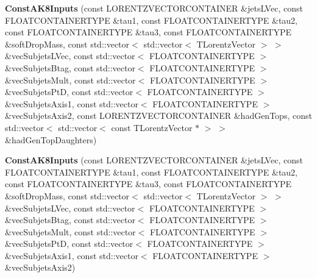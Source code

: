 \begin{DoxyCompactItemize}
\item 
\hypertarget{classttUtility_1_1ConstAK8Inputs_a355eeb50c57d2a7cbe153cd94ba368e7}{{\bfseries Const\-A\-K8\-Inputs} (const L\-O\-R\-E\-N\-T\-Z\-V\-E\-C\-T\-O\-R\-C\-O\-N\-T\-A\-I\-N\-E\-R \&jets\-L\-Vec, const F\-L\-O\-A\-T\-C\-O\-N\-T\-A\-I\-N\-E\-R\-T\-Y\-P\-E \&tau1, const F\-L\-O\-A\-T\-C\-O\-N\-T\-A\-I\-N\-E\-R\-T\-Y\-P\-E \&tau2, const F\-L\-O\-A\-T\-C\-O\-N\-T\-A\-I\-N\-E\-R\-T\-Y\-P\-E \&tau3, const F\-L\-O\-A\-T\-C\-O\-N\-T\-A\-I\-N\-E\-R\-T\-Y\-P\-E \&soft\-Drop\-Mass, const std\-::vector$<$ std\-::vector$<$ T\-Lorentz\-Vector $>$ $>$ \&vec\-Subjets\-L\-Vec, const std\-::vector$<$ F\-L\-O\-A\-T\-C\-O\-N\-T\-A\-I\-N\-E\-R\-T\-Y\-P\-E $>$ \&vec\-Subjets\-Btag, const std\-::vector$<$ F\-L\-O\-A\-T\-C\-O\-N\-T\-A\-I\-N\-E\-R\-T\-Y\-P\-E $>$ \&vec\-Subjets\-Mult, const std\-::vector$<$ F\-L\-O\-A\-T\-C\-O\-N\-T\-A\-I\-N\-E\-R\-T\-Y\-P\-E $>$ \&vec\-Subjets\-Pt\-D, const std\-::vector$<$ F\-L\-O\-A\-T\-C\-O\-N\-T\-A\-I\-N\-E\-R\-T\-Y\-P\-E $>$ \&vec\-Subjets\-Axis1, const std\-::vector$<$ F\-L\-O\-A\-T\-C\-O\-N\-T\-A\-I\-N\-E\-R\-T\-Y\-P\-E $>$ \&vec\-Subjets\-Axis2, const L\-O\-R\-E\-N\-T\-Z\-V\-E\-C\-T\-O\-R\-C\-O\-N\-T\-A\-I\-N\-E\-R \&had\-Gen\-Tops, const std\-::vector$<$ std\-::vector$<$ const T\-Lorentz\-Vector $\ast$ $>$ $>$ \&had\-Gen\-Top\-Daughters)}\label{classttUtility_1_1ConstAK8Inputs_a355eeb50c57d2a7cbe153cd94ba368e7}

\item 
\hypertarget{classttUtility_1_1ConstAK8Inputs_afb4037a21d4530d01d600dfdcf76971e}{{\bfseries Const\-A\-K8\-Inputs} (const L\-O\-R\-E\-N\-T\-Z\-V\-E\-C\-T\-O\-R\-C\-O\-N\-T\-A\-I\-N\-E\-R \&jets\-L\-Vec, const F\-L\-O\-A\-T\-C\-O\-N\-T\-A\-I\-N\-E\-R\-T\-Y\-P\-E \&tau1, const F\-L\-O\-A\-T\-C\-O\-N\-T\-A\-I\-N\-E\-R\-T\-Y\-P\-E \&tau2, const F\-L\-O\-A\-T\-C\-O\-N\-T\-A\-I\-N\-E\-R\-T\-Y\-P\-E \&tau3, const F\-L\-O\-A\-T\-C\-O\-N\-T\-A\-I\-N\-E\-R\-T\-Y\-P\-E \&soft\-Drop\-Mass, const std\-::vector$<$ std\-::vector$<$ T\-Lorentz\-Vector $>$ $>$ \&vec\-Subjets\-L\-Vec, const std\-::vector$<$ F\-L\-O\-A\-T\-C\-O\-N\-T\-A\-I\-N\-E\-R\-T\-Y\-P\-E $>$ \&vec\-Subjets\-Btag, const std\-::vector$<$ F\-L\-O\-A\-T\-C\-O\-N\-T\-A\-I\-N\-E\-R\-T\-Y\-P\-E $>$ \&vec\-Subjets\-Mult, const std\-::vector$<$ F\-L\-O\-A\-T\-C\-O\-N\-T\-A\-I\-N\-E\-R\-T\-Y\-P\-E $>$ \&vec\-Subjets\-Pt\-D, const std\-::vector$<$ F\-L\-O\-A\-T\-C\-O\-N\-T\-A\-I\-N\-E\-R\-T\-Y\-P\-E $>$ \&vec\-Subjets\-Axis1, const std\-::vector$<$ F\-L\-O\-A\-T\-C\-O\-N\-T\-A\-I\-N\-E\-R\-T\-Y\-P\-E $>$ \&vec\-Subjets\-Axis2)}\label{classttUtility_1_1ConstAK8Inputs_afb4037a21d4530d01d600dfdcf76971e}


\end{DoxyCompactItemize}
